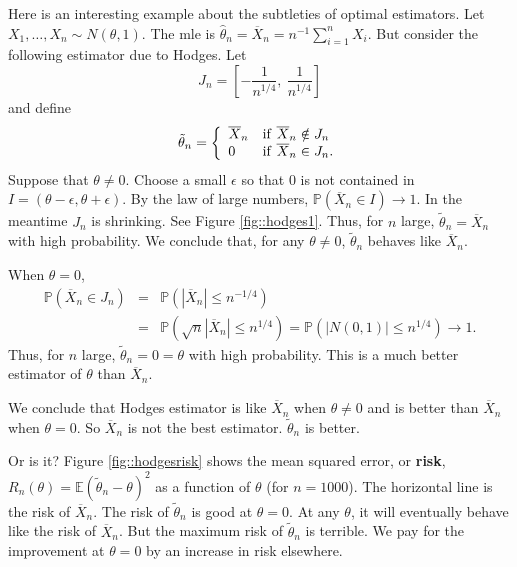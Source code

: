 \documentclass[twoside,12pt]{article}
\newcommand\E{\mathbb{E}}
\begin{document}
Here is an interesting example about the subtleties of optimal estimators.
Let $X_1,\ldots, X_n \sim N(\theta,1)$.
The mle is $\widehat\theta_n = \overline{X}_n = n^{-1}\sum_{i=1}^n X_i$.
But consider the following estimator due to Hodges.
Let
\begin{equation}
J_n = \left[- \frac{1}{n^{1/4}},\ \frac{1}{n^{1/4}}\right]
\end{equation}
and define
\begin{equation}
\tilde{\theta}_n =
\left\{
\begin{array}{ll}
\overline{X}_n & {\rm if\ } \overline{X}_n \notin J_n\\
0              & {\rm if\ } \overline{X}_n \in J_n.
\end{array}
\right.
\end{equation}
Suppose that $\theta \neq 0$.
Choose a small $\epsilon$ so that
0 is not contained in $I=(\theta - \epsilon,\theta + \epsilon)$.
By the law of large numbers,
$\mathbb{P}(\overline{X}_n \in I) \to 1$.
In the meantime $J_n$ is shrinking.
See Figure \ref{fig::hodges1}.
Thus, for $n$ large,
$\tilde{\theta}_n = \overline{X}_n$ with high probability.
We conclude that, for any $\theta \neq 0$,
$\tilde{\theta}_n$ behaves like $\overline{X}_n$.

When $\theta =0$,
\begin{eqnarray}
\mathbb{P}(\overline{X}_n \in J_n ) &=& \mathbb{P}(|\overline{X}_n| \leq n^{-1/4})\\
&=& \mathbb{P}(\sqrt{n}|\overline{X}_n| \leq n^{1/4})=
\mathbb{P}( |N(0,1)| \leq n^{1/4}) \to 1.
\end{eqnarray}
Thus, for $n$ large,
$\tilde{\theta}_n = 0=\theta$ with high probability.
This is a much better estimator of $\theta$ than $\overline{X}_n$.

We conclude that
Hodges estimator is like $\overline{X}_n$ when $\theta \neq 0$ and
is better than $\overline{X}_n$ when $\theta = 0$.
So $\overline{X}_n$ is not the best estimator.
$\tilde{\theta}_n$ is better.

Or is it?
Figure \ref{fig::hodgesrisk}
shows the mean squared error, or {\bf risk},
$R_n(\theta) = \E(\tilde{\theta}_n - \theta)^2$
as a function of $\theta$ (for $n=1000$).
The horizontal line is the risk of $\overline{X}_n$.
The risk of $\tilde{\theta}_n$ is good at $\theta=0$.
At any $\theta$, it will eventually behave like the risk
of $\overline{X}_n$.
But the maximum risk of 
$\tilde{\theta}_n$ is terrible.
We pay for the improvement at $\theta=0$ by an increase in risk elsewhere.
\end{document}
